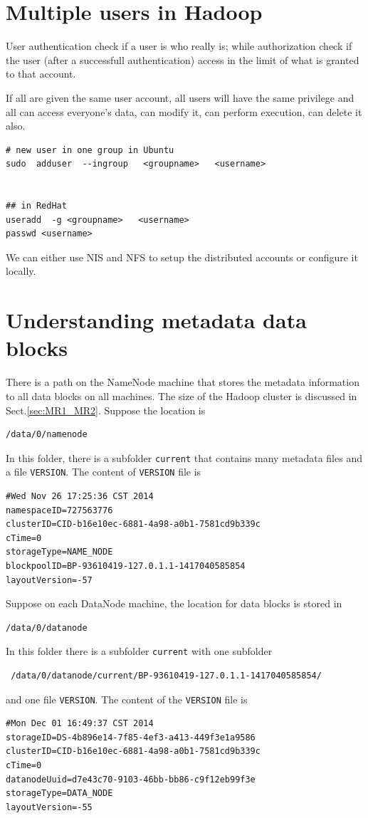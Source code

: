 \section{Multiple users in Hadoop}
\label{sec:manage_users_Hadoop}

User authentication check if a user is who really is; while authorization check
if the user (after a successfull authentication) access in the limit of what is
granted to that account.

If all are given the same user account, all users will have the same privilege
and all can access everyone's  data, can modify it, can perform execution, can
delete it also. 
\begin{verbatim}
# new user in one group in Ubuntu
sudo  adduser  --ingroup   <groupname>   <username>


## in RedHat
useradd  -g <groupname>   <username>
passwd <username>
\end{verbatim}
We can either use NIS and NFS to setup the distributed accounts or configure it
locally.


\section{Understanding metadata data blocks}
\label{sec:metadata_vs_datablock}

There is a path on the NameNode machine that stores the metadata information to
all data blocks on all machines. The size of the Hadoop cluster is discussed in
Sect.\ref{sec:MR1_MR2}. Suppose the location is
\begin{verbatim}
/data/0/namenode
\end{verbatim}
In this folder, there is a subfolder \verb!current! that contains many 
metadata files and a file \verb!VERSION!. The content of \verb!VERSION! file is
\begin{verbatim}
#Wed Nov 26 17:25:36 CST 2014
namespaceID=727563776
clusterID=CID-b16e10ec-6881-4a98-a0b1-7581cd9b339c
cTime=0
storageType=NAME_NODE
blockpoolID=BP-93610419-127.0.1.1-1417040585854
layoutVersion=-57
\end{verbatim}

Suppose on each DataNode machine, the location for data blocks is stored in 
\begin{verbatim}
/data/0/datanode
\end{verbatim}  
In this folder there is a subfolder \verb!current! with one subfolder
\begin{verbatim}
 /data/0/datanode/current/BP-93610419-127.0.1.1-1417040585854/
\end{verbatim} 
and one file \verb!VERSION!. The content of the \verb!VERSION! file is
\begin{verbatim}
#Mon Dec 01 16:49:37 CST 2014
storageID=DS-4b896e14-7f85-4ef3-a413-449f3e1a9586
clusterID=CID-b16e10ec-6881-4a98-a0b1-7581cd9b339c
cTime=0
datanodeUuid=d7e43c70-9103-46bb-bb86-c9f12eb99f3e
storageType=DATA_NODE
layoutVersion=-55
\end{verbatim}

